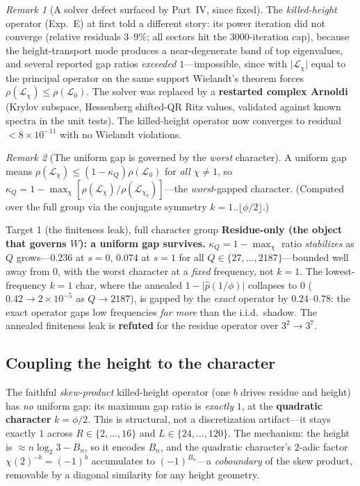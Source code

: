 \documentclass[11pt]{article}
\newcommand{\Lcal}{\mathcal{L}}
\theoremstyle{plain}
\theoremstyle{remark}
\newtheorem*{remark}{Remark}
\begin{document}
\begin{remark}[A solver defect surfaced by Part~IV, since fixed]\label{rem:Esolver}
The \emph{killed-height} operator (Exp.~E) at first told a different story: its
power iteration did not converge (relative residuals $3$--$9\%$; all sectors hit
the $3000$-iteration cap), because the height-transport mode produces a
near-degenerate band of top eigenvalues, and several reported gap ratios
\emph{exceeded $1$}---impossible, since with $\lvert\Lcal_\chi\rvert$ equal to the
principal operator on the same support Wielandt's theorem forces
$\rho(\Lcal_\chi)\le\rho(\Lcal_0)$. The solver was replaced by a \textbf{restarted
complex Arnoldi} (Krylov subspace, Hessenberg shifted-QR Ritz values, validated
against known spectra in the unit tests). The killed-height operator now converges
to residual $<8\times10^{-11}$ with no Wielandt violations.
\end{remark}

\begin{remark}[The uniform gap is governed by the \emph{worst} character]
A uniform gap means $\rho(\Lcal_\chi)\le(1-\kappa_Q)\rho(\Lcal_0)$ for
\emph{all} $\chi\ne1$, so
$\kappa_Q=1-\max_\chi[\rho(\Lcal_\chi)/\rho(\Lcal_{\chi_0})]$---the
\emph{worst}-gapped character. (Computed over the full group via the conjugate
symmetry $k=1..\lfloor\phi/2\rfloor$.)
\end{remark}

\begin{findingbox}{Target 1 (the finiteness leak), full character group}
\textbf{Residue-only (the object that governs $W$): a uniform gap survives.}
$\kappa_Q=1-\max_\chi$ ratio \emph{stabilizes} as $Q$ grows---$0.236$ at
$s{=}0$, $0.074$ at $s{=}1$ for all $Q\in\{27,\dots,2187\}$---bounded well away
from $0$, with the worst character at a \emph{fixed} frequency, not $k=1$. The
lowest-frequency $k{=}1$ char, where the annealed $1-\lvert\hat p(1/\phi)\rvert$
collapses to $0$ ($0.42\to2\times10^{-5}$ as $Q\to2187$), is gapped by the
\emph{exact} operator by $0.24$--$0.78$: the exact operator gaps low frequencies
\emph{far more} than the i.i.d.\ shadow. The annealed finiteness leak is
\textbf{refuted} for the residue operator over $3^2\to3^7$.
\end{findingbox}

\subsection*{Coupling the height to the character}
The faithful \emph{skew-product} killed-height operator (one $b$ drives residue
and height) has \emph{no} uniform gap: its maximum gap ratio is \emph{exactly}
$1$, at the \textbf{quadratic character} $k=\phi/2$. This is structural, not a
discretization artifact---it stays exactly $1$ across $R\in\{2,\dots,16\}$ and
$L\in\{24,\dots,120\}$. The mechanism: the height is $\approx n\log_2 3-B_n$, so
it encodes $B_n$, and the quadratic character's $2$-adic factor
$\chi(2)^{-b}=(-1)^b$ accumulates to $(-1)^{B_n}$---a \emph{coboundary} of the
skew product, removable by a diagonal similarity for any height geometry.
\end{document}
